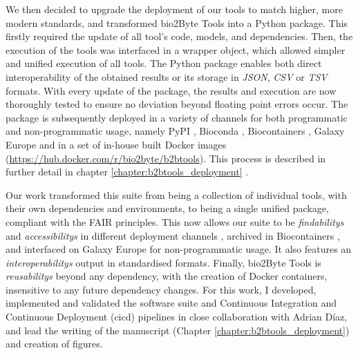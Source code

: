 We then decided to upgrade the deployment of our tools to match higher, more modern standards, and transformed bio2Byte Tools into a Python package. This firstly required the update of all tool's code, models, and dependencies. Then, the execution of the tools was interfaced in a wrapper object, which allowed simpler and unified execution of all tools. The Python package enables both direct interoperability of the obtained results or its storage in \textit{JSON}, \textit{CSV} or \textit{TSV} formats. With every update of the package, the results and execution are now thoroughly tested to ensure no deviation beyond floating point errors occur. The package is subsequently deployed in a variety of channels for both programmatic and non-programmatic usage, namely PyPI \cite{pypi}, Bioconda \cite{gruning_bioconda_2018}, Biocontainers \cite{da_veiga_leprevost_biocontainers_2017}, Galaxy Europe \cite{afgan_galaxy_2018} and in a set of in-house built Docker images (\href{https://hub.docker.com/r/bio2byte/b2btools}{https://hub.docker.com/r/bio2byte/b2btools}). This process is described in further detail in chapter \ref{chapter:b2btools_deployment} \cite{gavalda-garcia_bio2byte_2024}. 

Our work transformed this suite from being a collection of individual tools, with their own dependencies and environments, to being a single unified package, compliant with the FAIR principles. This now allows our suite to be \textit{\Glspl{findability}} and \textit{\Glspl{accessibility}} in different deployment channels \cite{pypi, gruning_bioconda_2018}, archived in Biocontainers \cite{da_veiga_leprevost_biocontainers_2017}, and interfaced on Galaxy Europe \cite{afgan_galaxy_2018} for non-programmatic usage. It also features an \textit{\Glspl{interoperability}} output in standardised formats. Finally, bio2Byte Tools is \textit{\Glspl{reusability}} beyond any dependency, with the creation of Docker containers, insensitive to any future dependency changes. For this work, I developed, implemented and validated the software suite and Continuous Integration and Continuous Deployment (\gls{cicd}) pipelines in close collaboration with Adrian Díaz, and lead the writing of the manuscript (Chapter \ref{chapter:b2btools_deployment}) \cite{gavalda-garcia_bio2byte_2024} and creation of figures. 

